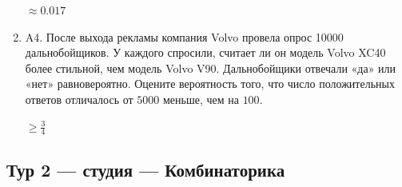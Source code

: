 \documentclass[12pt]{article}
\newenvironment{problem}{}{}
\newenvironment{sol}{}{} %
\begin{document}
\begin{enumerate}
\begin{problem}
\begin{sol}
$\approx 0.017$
\end{sol}
\end{problem}

\begin{problem}
\item[A4.] После выхода рекламы компания Volvo провела опрос 10000 дальнобойщиков. У каждого спросили, считает ли он модель Volvo XC40 более стильной, чем модель Volvo V90. Дальнобойщики отвечали «да» или «нет» равновероятно. Оцените вероятность того, что число положительных ответов отличалось от $5000$ меньше, чем на $100$.

\begin{sol}
$\geq \frac{3}{4}$
\end{sol}
\end{problem}




\end{enumerate}


\newpage
\subsection{Тур 2 — студия — Комбинаторика}
\end{document}
